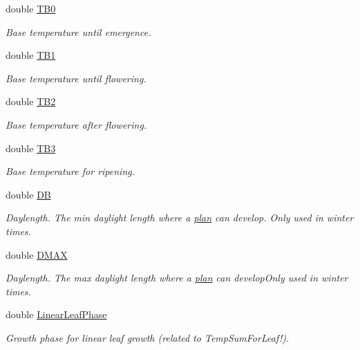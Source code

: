 \begin{DoxyCompactItemize}
double \hyperlink{classphenology_a11a737c8b597846f9c2f3830c9730fa5}{TB0}
\begin{DoxyCompactList}\small\item\em Base temperature until emergence. \item\end{DoxyCompactList}\item 
double \hyperlink{classphenology_a9402604c0ae15b2e4a38817117438b82}{TB1}
\begin{DoxyCompactList}\small\item\em Base temperature until flowering. \item\end{DoxyCompactList}\item 
double \hyperlink{classphenology_a1e71f980392540030063ddb992724422}{TB2}
\begin{DoxyCompactList}\small\item\em Base temperature after flowering. \item\end{DoxyCompactList}\item 
double \hyperlink{classphenology_aa561df2c5bfcf20a8158dd5d4e0aa961}{TB3}
\begin{DoxyCompactList}\small\item\em Base temperature for ripening. \item\end{DoxyCompactList}\item 
double \hyperlink{classphenology_a93325b0130d6af4026a9630edab6bf31}{DB}
\begin{DoxyCompactList}\small\item\em Daylength. The min daylight length where a \hyperlink{classplan}{plan} can develop. Only used in winter times. \item\end{DoxyCompactList}\item 
double \hyperlink{classphenology_a2d09205396bf4aa5f3d291387da6b099}{DMAX}
\begin{DoxyCompactList}\small\item\em Daylength. The max daylight length where a \hyperlink{classplan}{plan} can developOnly used in winter times. \item\end{DoxyCompactList}\item 
double \hyperlink{classphenology_a88c5292d2d713236a2403cb0a100655c}{LinearLeafPhase}
\begin{DoxyCompactList}\small\item\em Growth phase for linear leaf growth (related to TempSumForLeaf!). \item\end{DoxyCompactList}\item 

\end{DoxyCompactItemize}
